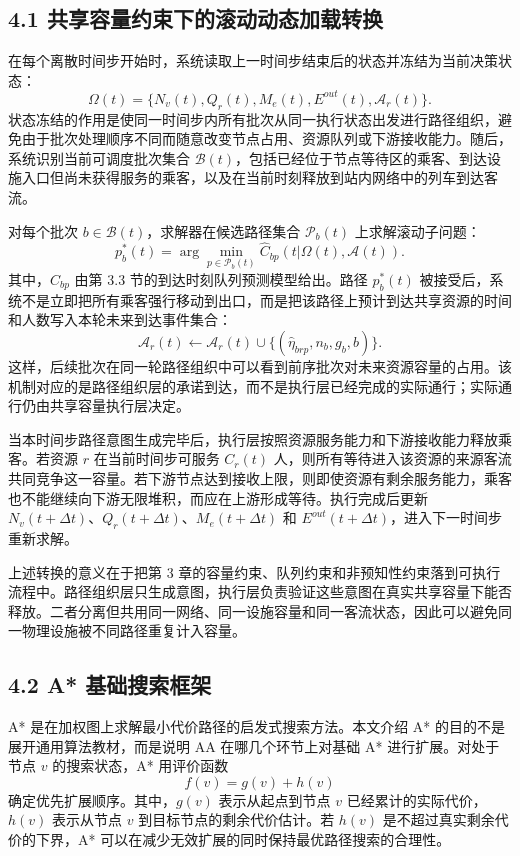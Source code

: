 \documentclass[UTF8,a4paper,12pt]{ctexart}
\begin{document}
\subsection{4.1 共享容量约束下的滚动动态加载转换}

在每个离散时间步开始时，系统读取上一时间步结束后的状态并冻结为当前决策状态：
\[
\Omega(t)=\{N_v(t),Q_r(t),M_e(t),E^{out}(t),\mathcal A_r(t)\}.
\]
状态冻结的作用是使同一时间步内所有批次从同一执行状态出发进行路径组织，避免由于批次处理顺序不同而随意改变节点占用、资源队列或下游接收能力。随后，系统识别当前可调度批次集合 \(\mathcal B(t)\)，包括已经位于节点等待区的乘客、到达设施入口但尚未获得服务的乘客，以及在当前时刻释放到站内网络中的列车到达客流。

对每个批次 \(b\in\mathcal B(t)\)，求解器在候选路径集合 \(\mathcal P_b(t)\) 上求解滚动子问题：
\[
p_b^{*}(t)=\arg\min_{p\in\mathcal P_b(t)}
\widehat C_{bp}(t|\Omega(t),\mathcal A(t)).
\]
其中，\(\widehat C_{bp}\) 由第 3.3 节的到达时刻队列预测模型给出。路径 \(p_b^{*}(t)\) 被接受后，系统不是立即把所有乘客强行移动到出口，而是把该路径上预计到达共享资源的时间和人数写入本轮未来到达事件集合：
\[
\mathcal A_r(t)\leftarrow
\mathcal A_r(t)\cup\{(\widehat\eta_{brp},n_b,g_b,b)\}.
\]
这样，后续批次在同一轮路径组织中可以看到前序批次对未来资源容量的占用。该机制对应的是路径组织层的承诺到达，而不是执行层已经完成的实际通行；实际通行仍由共享容量执行层决定。

当本时间步路径意图生成完毕后，执行层按照资源服务能力和下游接收能力释放乘客。若资源 \(r\) 在当前时间步可服务 \(C_r(t)\) 人，则所有等待进入该资源的来源客流共同竞争这一容量。若下游节点达到接收上限，则即使资源有剩余服务能力，乘客也不能继续向下游无限堆积，而应在上游形成等待。执行完成后更新 \(N_v(t+\Delta t)\)、\(Q_r(t+\Delta t)\)、\(M_e(t+\Delta t)\) 和 \(E^{out}(t+\Delta t)\)，进入下一时间步重新求解。

上述转换的意义在于把第 3 章的容量约束、队列约束和非预知性约束落到可执行流程中。路径组织层只生成意图，执行层负责验证这些意图在真实共享容量下能否释放。二者分离但共用同一网络、同一设施容量和同一客流状态，因此可以避免同一物理设施被不同路径重复计入容量。

\subsection{4.2 A* 基础搜索框架}

A* 是在加权图上求解最小代价路径的启发式搜索方法。本文介绍 A* 的目的不是展开通用算法教材，而是说明 AA 在哪几个环节上对基础 A* 进行扩展。对处于节点 \(v\) 的搜索状态，A* 用评价函数
\[
f(v)=g(v)+h(v)
\]
确定优先扩展顺序。其中，\(g(v)\) 表示从起点到节点 \(v\) 已经累计的实际代价，\(h(v)\) 表示从节点 \(v\) 到目标节点的剩余代价估计。若 \(h(v)\) 是不超过真实剩余代价的下界，A* 可以在减少无效扩展的同时保持最优路径搜索的合理性。
\end{document}

